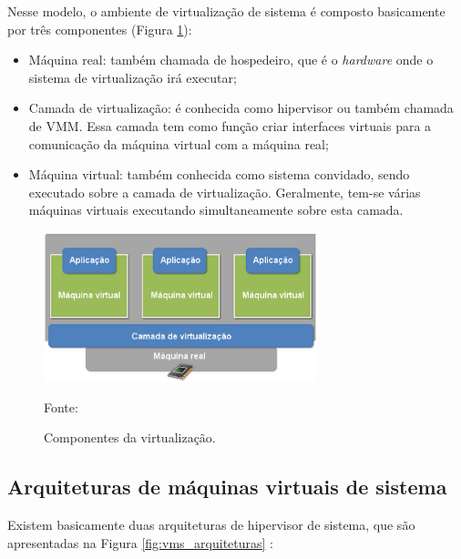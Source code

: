 Nesse modelo, o ambiente de virtualização de sistema é composto basicamente por três componentes (Figura \ref{fig:virtcomponentes}):
\begin{itemize}
 \item Máquina real: também chamada de hospedeiro, que é o \textit{hardware} onde o sistema de virtualização irá executar;
 \item Camada de virtualização: é conhecida como hipervisor ou também chamada de \ac{VMM}. Essa camada tem como função criar interfaces 
 virtuais para a comunicação da máquina virtual com a máquina real;
 \item Máquina virtual: também conhecida como sistema convidado, sendo executado sobre a camada de virtualização. Geralmente, tem-se
 várias máquinas virtuais executando simultaneamente sobre esta camada.
\end{itemize}

\begin{figure}[h!]
 \centering
 \includegraphics[width=300px]{img/virtcomponentes.eps}
 \caption{Componentes da virtualização.}
 \label{fig:virtcomponentes}
 Fonte: \citet{andrade2011}
\end{figure}

\subsection{Arquiteturas de máquinas virtuais de sistema}
\label{section:virtarquit}

Existem basicamente duas arquiteturas de hipervisor de sistema, que são apresentadas na Figura \ref{fig:vms_arquiteturas} \cite{maziero2013}:

